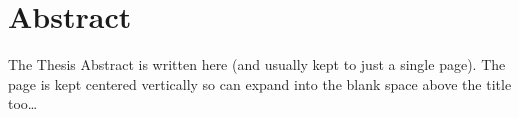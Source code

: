 \chapter*{Abstract}

The Thesis Abstract is written here (and usually kept to just a single page). The page is kept centered vertically so can expand into the blank space above the title too\ldots
